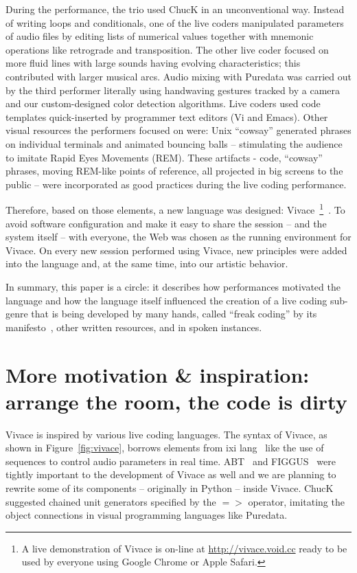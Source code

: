 \documentclass[letterpaper, 12pt]{article}
\begin{document}
During the performance, the trio used ChucK in an unconventional
way. Instead of writing loops and conditionals, one of the live coders
manipulated parameters of audio files by editing lists of numerical
values together with mnemonic operations like retrograde and
transposition.  The other live coder focused on more fluid lines with
large sounds having evolving characteristics; this contributed with
larger musical arcs.  Audio mixing with Puredata was carried out by the
third performer literally using handwaving gestures tracked by a camera and
our custom-designed color detection algorithms. Live coders used code
templates quick-inserted by programmer text editors (Vi and Emacs). Other visual
resources the performers focused on were: Unix ``cowsay'' generated phrases on
individual terminals and animated bouncing balls -- stimulating the audience to
imitate Rapid Eyes Movements (REM). These artifacts - code, ``cowsay'' phrases,
moving REM-like points of reference, all projected in big screens to the public
-- were incorporated as good practices during the live coding performance.

Therefore, based on those elements, a new language was designed:
Vivace~\footnote{A live demonstration of Vivace is on-line at
  \url{http://vivace.void.cc} ready to be used by everyone using
  Google Chrome or Apple Safari.}~\citep*{Vivace}.  To avoid software
configuration and make it easy to share the session -- and the system
itself -- with everyone, the Web was chosen as the running
environment for Vivace. On every new session performed using Vivace,
new principles were added into the language and, at the same time,
into our artistic behavior.

In summary, this paper is a circle: it describes how performances
motivated the language and how the language itself influenced the
creation of a live coding sub-genre that is being developed by many
hands, called ``freak coding'' by its manifesto~\citep*{freak}, other
written resources, and in spoken instances.

\parskip 18pt

\section{More motivation \& inspiration: arrange the room, the code is dirty}

Vivace is inspired by various live coding languages. The syntax of
Vivace, as shown in Figure~\ref{fig:vivace}, borrows elements from ixi
lang~\citep{magnusson2011ixi} like the use of sequences to control
audio parameters in real time. ABT~\citep{fabbri} and
FIGGUS~\citep{fabbri2} were tightly important to the development of
Vivace as well and we are planning to rewrite some of its components
-- originally in Python -- inside Vivace. ChucK suggested chained unit
generators specified by the $=>$ operator, imitating the object
connections in visual programming languages like Puredata.
\end{document}
